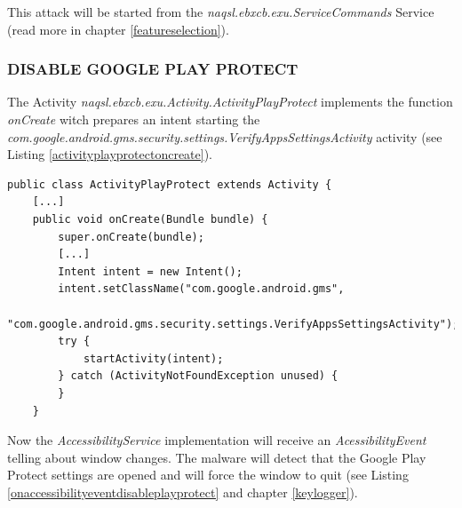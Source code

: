 \documentclass[10pt,titlepage]{article}
\begin{document}
This attack will be started from the \textit{naqsl.ebxcb.exu.ServiceCommands} Service (read more in chapter \ref{featureselection}).

\newpage
\subsubsection{DISABLE GOOGLE PLAY PROTECT} \label{playprotect}
The Activity \textit{naqsl.ebxcb.exu.Activity.ActivityPlayProtect} implements the function \textit{onCreate} witch prepares an intent starting the \textit{com.google.android.gms.security.settings.VerifyAppsSettingsActivity} activity (see Listing \ref{activityplayprotectoncreate}). 

\begin{lstlisting}[label=activityplayprotectoncreate,caption=The \textit{naqsl.ebxcb.exu.Activity.ActivityPlayProtect.onCreate} function is intended to open the Google Play Protect screen so that the user or the Accessibility Service of the malware is potentially able to disable the protection from Google.,frame=tb]
public class ActivityPlayProtect extends Activity {
    [...]
    public void onCreate(Bundle bundle) {
        super.onCreate(bundle);
        [...]
        Intent intent = new Intent();
        intent.setClassName("com.google.android.gms",
                     "com.google.android.gms.security.settings.VerifyAppsSettingsActivity");
        try {
            startActivity(intent);
        } catch (ActivityNotFoundException unused) {
        }
    }
\end{lstlisting}

Now the \textit{AccessibilityService} implementation will receive an \textit{AcessibilityEvent} telling about window changes. The malware will detect that the Google Play Protect settings are opened and will force the window to quit (see Listing \ref{onaccessibilityeventdisableplayprotect} and chapter \ref{keylogger}).
\end{document}
